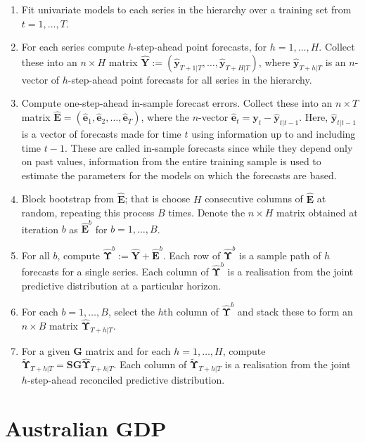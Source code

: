 \documentclass[graybox]{svmult}
\begin{document}
\begin{enumerate}
	\item Fit univariate models to each series in the hierarchy over a training set from $t=1,\dots,T$.
	\item For each series compute $h$-step-ahead point forecasts, for $h=1,\dots,H$. Collect these into an $n\times H$ matrix $\hat{\bm{Y}}:=(\hat{\bm{y}}_{T+1|T},\dots,\hat{\bm{y}}_{T+H|T})$, where $\hat{\bm{y}}_{T+h|T}$ is an $n$-vector of $h$-step-ahead point forecasts for all series in the hierarchy.
	\item Compute one-step-ahead in-sample forecast errors. Collect these into an $n \times T$ matrix ${\hat{\bm E}}=(\hat{\bm{e}}_1,\hat{\bm{e}}_2,\dots,\hat{\bm{e}}_T)$, where the $n$-vector $\hat{\bm{e}}_t={\bm{y}}_t-\hat{\bm {y}}_{t|t-1}$. Here, $\hat{\bm {y}}_{t|t-1}$ is a vector of forecasts made for time $t$ using information up to and including time $t-1$. These are called in-sample forecasts since while they depend only on past values, information from the entire training sample is used to estimate the parameters for the models on which the forecasts are based.
	\item Block bootstrap from $\hat{\bm{E}}$; that is choose $H$ consecutive columns of $\hat{{\bm E}}$ at random, repeating this process $B$ times. Denote the $n\times H$ matrix obtained at iteration $b$ as $\hat{{\bm E}}^b$ for $b=1,\dots,B$.
	\item For all $b$, compute $\hat{\bm\Upsilon}^b:=\hat{\bm{Y}}+\hat{\bm{E}}^b$. Each row of $\hat{\bm \Upsilon}^b$ is a sample path of $h$ forecasts for a single series. Each column of $\hat{\bm \Upsilon}^b$ is a realisation from the joint predictive distribution at a particular horizon.
	\item For each $b=1,\dots,B$, select the $h$th column of $\hat{\bm \Upsilon}^b$ and stack these to form an $n\times B$ matrix $\hat{\bm{\Upsilon}}_{T+h|T}$.
	\item For a given ${\bm G}$ matrix and for each $h=1,\dots,H$, compute $\tilde{\bm{\Upsilon}}_{T+h|T}={\bm S}{\bm G}\hat{\bm{\Upsilon}}_{T+h|T}$.  Each column of $\tilde{\bm \Upsilon}_{T+h|T}$ is a realisation from the joint $h$-step-ahead reconciled predictive distribution.
\end{enumerate}

\section{Australian GDP}\label{sec:data}
\end{document}
